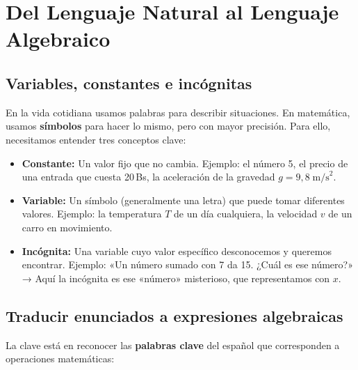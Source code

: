 \documentclass[12pt, a4paper]{article}
\begin{document}
\newpage

\section{Del Lenguaje Natural al Lenguaje Algebraico}

\subsection{Variables, constantes e incógnitas}

En la vida cotidiana usamos palabras para describir situaciones. En matemática, usamos \textbf{símbolos} para hacer lo mismo, pero con mayor precisión. Para ello, necesitamos entender tres conceptos clave:

\begin{cuadroteoria}
\begin{itemize}[leftmargin=*]
  \item \textbf{Constante:} Un valor fijo que no cambia. Ejemplo: el número 5, el precio de una entrada que cuesta 20\,Bs, la aceleración de la gravedad $g = 9{,}8\;\text{m/s}^2$.
  \item \textbf{Variable:} Un símbolo (generalmente una letra) que puede tomar diferentes valores. Ejemplo: la temperatura $T$ de un día cualquiera, la velocidad $v$ de un carro en movimiento.
  \item \textbf{Incógnita:} Una variable cuyo valor específico desconocemos y queremos encontrar. Ejemplo: «Un número sumado con 7 da 15. ¿Cuál es ese número?» → Aquí la incógnita es ese «número» misterioso, que representamos con $x$.
\end{itemize}
\end{cuadroteoria}

\subsection{Traducir enunciados a expresiones algebraicas}

La clave está en reconocer las \textbf{palabras clave} del español que corresponden a operaciones matemáticas:
\end{document}
